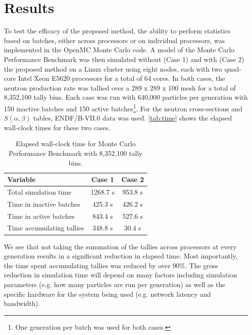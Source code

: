 \section{Results}
\label{sec:tally-reduction-results}

To test the efficacy of the proposed method, the ability to perform statistics
based on batches, either across processors or on individual processors, was
implemented in the OpenMC Monte Carlo code. A model of the Monte Carlo
Performance Benchmark \cite{mc-hoogenboom-2011} was then simulated without (Case
1) and with (Case 2) the proposed method on a Linux cluster using eight nodes,
each with two quad-core Intel Xeon E5620 processors for a total of 64 cores. In
both cases, the neutron production rate was tallied over a 289 x 289 x 100 mesh
for a total of 8,352,100 tally bins. Each case was run with 640,000 particles
per generation with 150 inactive batches and 150 active batches\footnote{One
  generation per batch was used for both cases.}. For the neutron cross-sections
and $S(\alpha,\beta)$ tables, ENDF/B-VII.0 data was used. \autoref{tab:time}
shows the elapsed wall-clock times for these two cases.
\begin{table}[htb]
  \centering
  \caption{Elapsed wall-clock time for Monte Carlo Performance Benchmark with
    8,352,100 tally bins.}
  \label{tab:time}
  \begin{tabular}{lcc}
    \toprule
    Variable & Case 1 & Case 2 \\
    \midrule
    Total simulation time     & 1268.7 s & 953.8 s \\
    Time in inactive batches  &  425.3 s & 426.2 s \\
    Time in active batches    &  843.4 s & 527.6 s \\
    Time accumulating tallies &  348.8 s &  30.4 s \\
    \bottomrule
  \end{tabular}
\end{table}
We see that not taking the summation of the tallies across processors at every
generation results in a significant reduction in elapsed time. Most importantly,
the time spent accumulating tallies was reduced by over 90\%. The gross
reduction in simulation time will depend on many factors including simulation
parameters (e.g. how many particles are run per generation) as well as the
specific hardware for the system being used (e.g. network latency and
bandwidth).

